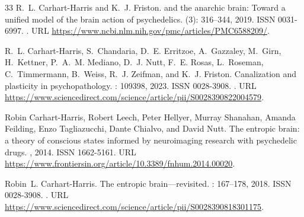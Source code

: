 \documentclass[12pt,fleqn]{article}
\begin{document}
\begin{thebibliography}{33}
  R.~L. Carhart-Harris and K.~J. Friston.
   and the anarchic brain: Toward a unified model of the brain
  action of psychedelics.
   (3): 316--344, 2019.
  \newblock ISSN 0031-6997.
  \newblock {}.
  \newblock URL \url{https://www.ncbi.nlm.nih.gov/pmc/articles/PMC6588209/}.

  R.~L. Carhart-Harris, S.~Chandaria, D.~E. Erritzoe, A.~Gazzaley, M.~Girn,
  H.~Kettner, P.~A.~M. Mediano, D.~J. Nutt, F.~E. Rosas, L.~Roseman,
  C.~Timmermann, B.~Weiss, R.~J. Zeifman, and K.~J. Friston.
  \newblock Canalization and plasticity in psychopathology.
  : 109398, 2023.
  \newblock ISSN 0028-3908.
  \newblock {}.
  \newblock URL
  \url{https://www.sciencedirect.com/science/article/pii/S0028390822004579}.

  Robin Carhart-Harris, Robert Leech, Peter Hellyer, Murray Shanahan, Amanda
  Feilding, Enzo Tagliazucchi, Dante Chialvo, and David Nutt.
  \newblock The entropic brain: a theory of conscious states informed by
  neuroimaging research with psychedelic drugs.
  , 2014.
  \newblock ISSN 1662-5161.
  \newblock URL
  \url{https://www.frontiersin.org/article/10.3389/fnhum.2014.00020}.

  Robin~L. Carhart-Harris.
  \newblock The entropic brain---revisited.
  : 167--178, 2018.
  \newblock ISSN 0028-3908.
  \newblock {}.
  \newblock URL
  \url{https://www.sciencedirect.com/science/article/pii/S0028390818301175}.


\end{thebibliography}
\end{document}
